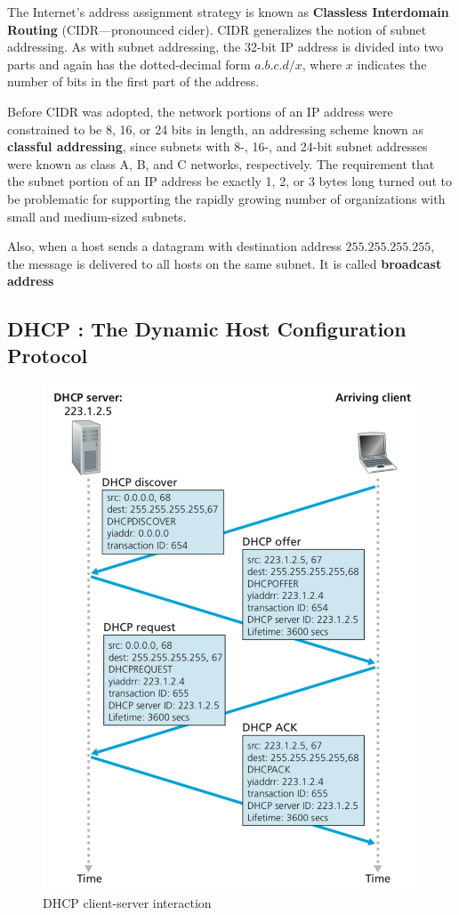 \documentclass[11pt]{article}
\begin{document}
The Internet’s address assignment strategy is known as \textbf{Classless Interdomain Routing} (CIDR—pronounced cider). CIDR generalizes the notion of subnet addressing. As with subnet addressing, the 32-bit IP address is divided into two parts and again has the dotted-decimal form $a.b.c.d/x$, where $x$ indicates the number of bits in the first part of the address.

Before CIDR was adopted, the network portions of an IP address were constrained to be 8, 16, or 24 bits in length, an addressing scheme known as \textbf{classful addressing}, since subnets with 8-, 16-, and 24-bit subnet addresses were known as class A, B, and C networks, respectively. The requirement that the subnet portion of an IP address be exactly 1, 2, or 3 bytes long turned out to be problematic for supporting the rapidly growing number of organizations with small and medium-sized subnets.

Also, when a host sends a datagram with destination address $255.255.255.255$, the message is delivered to all hosts on the same subnet. It is called \textbf{broadcast address}

\subsection{DHCP : The Dynamic Host Configuration Protocol}

\begin{figure}[h]
	\centering
	\includegraphics[width=0.45\linewidth]{images/DHCP.png}
	\caption{DHCP client-server interaction}
	\label{fig:DHCP}
\end{figure}
\end{document}
